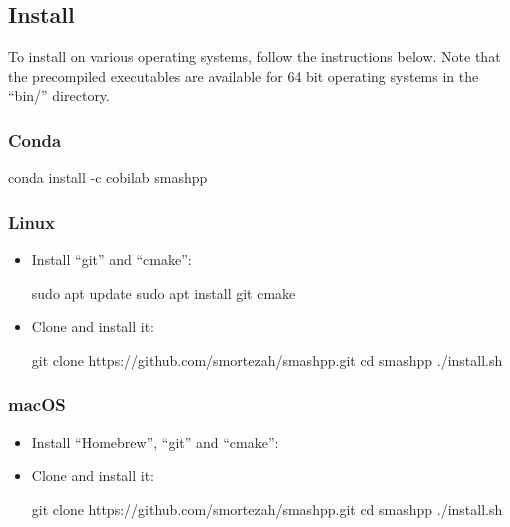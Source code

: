 \documentclass[a4paper,9pt]{extarticle}
\newcommand*{\method}[1]{\text{#1}\xspace}
\newcommand*{\smashpp}   {\method{Smash++}}
\begin{document}
\subsection{Install}
To install \smashpp on various operating systems, follow the instructions below. Note that the precompiled executables are available for 64 bit operating systems in the ``bin/'' directory.

\subsubsection*{Conda}
\begin{code}[style=bash]
  conda install -c cobilab smashpp
\end{code}

\subsubsection*{Linux}
\begin{itemize}
  \item Install ``git'' and ``cmake'':
\begin{code}[style=bash]
sudo apt update
sudo apt install git cmake
\end{code}
\item Clone \smashpp and install it:
\begin{code}[style=bash]
git clone https://github.com/smortezah/smashpp.git
cd smashpp
./install.sh
\end{code}
\end{itemize}

\subsubsection*{macOS}
\begin{itemize}
    \item Install ``Homebrew'', ``git'' and ``cmake'':
\item Clone \smashpp and install it:
\begin{code}[style=bash]
git clone https://github.com/smortezah/smashpp.git
cd smashpp
./install.sh
\end{code}
\end{itemize}
\end{document}
